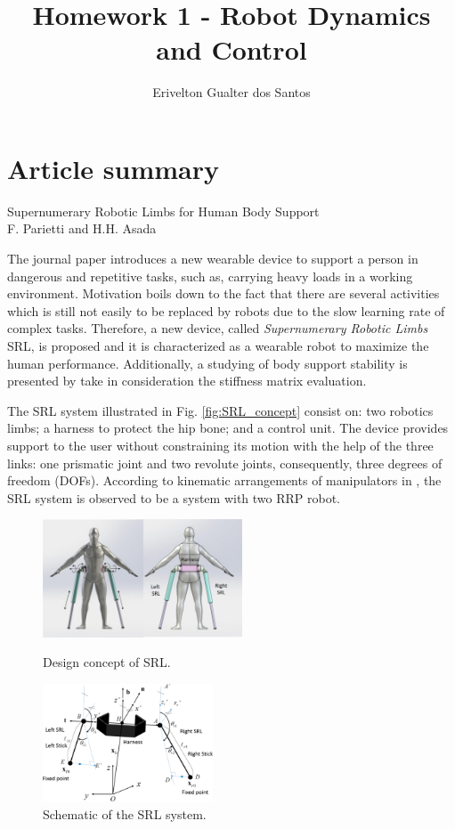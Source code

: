 \documentclass[a4paper,10pt]{article}
\title{Homework 1 - Robot Dynamics and Control}
\author{Erivelton Gualter dos Santos}
\begin{document}
\date{}
\maketitle

\section{Article summary}
\begin{center}
 Supernumerary Robotic Limbs for Human Body Support \cite{parietti2016supernumerary} \\
 F. Parietti and H.H. Asada
\end{center}

The journal paper introduces a new wearable device to support a person in dangerous and repetitive tasks, such as, carrying heavy loads in a working environment. Motivation boils down to the fact that there are several activities which is still not easily to be replaced by robots due to the slow learning rate of complex tasks. Therefore, a new device, called \textit{Supernumerary Robotic Limbs}  SRL, is proposed and it is characterized as a wearable robot to maximize the human performance. Additionally, a studying of body support stability is presented by take in consideration the stiffness matrix evaluation. 

The SRL system illustrated in Fig. \ref{fig:SRL_concept} consist on: two robotics limbs; a harness to protect the hip bone; and a control unit. The device provides support to the user without constraining its motion with the help of the three links: one prismatic joint and two revolute joints, consequently, three degrees of freedom (DOFs). According to kinematic arrangements of manipulators in \cite{spong2006robot}, the SRL system is observed to be a system with two RRP robot. 

\begin{figure}[H]
 \begin{minipage}{.5\textwidth}
  \centering
  \includegraphics[height=3.5cm]{SRL_concept.png}
  \caption{Design concept of SRL.} \label{fig:SRL_concept}
 \end{minipage}
 \begin{minipage}{.5\textwidth}
  \centering
  \includegraphics[height=3.5cm]{SRL_schematic.png}
  \caption{Schematic of the SRL system.} \label{fig:SRL_schematic}
 \end{minipage}
\end{figure}
\end{document}

